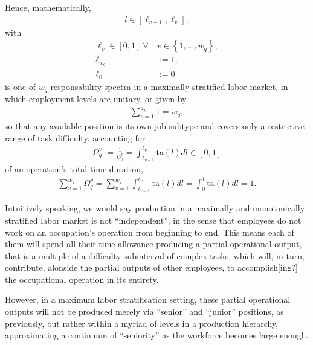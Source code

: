 \documentclass[hidelinks, nonatbib]{elsarticle}
\begin{document}
\begin{enumerate}
Hence, mathematically,
\begin{gather}
    l \in \left[
    \ell_{v-1}
    ,
    \ell_{v}
    \right]
    ,
\end{gather}
with
\begin{align}
    \ell_{v} \in [0,1]
    \
    \forall
    \
    &v \in 
    \left\{
        1, \dots, w_q
    \right\}
    ,
    \\
    \ell_{w_q} &:= 1
    ,
    \\
    \ell_0 &:= 0
\end{align}
is one of $w_q$ responsability spectra in a maximally stratified labor market, in which employment levels are unitary, or given by
\begin{gather}
    \sum_{v=1}^{w_q}
    1
    =
    w_q
    ,
\end{gather}
so that any available position is its own job subtype and covers only a restrictive range of task difficulty, accounting for
\begin{gather}
    \Omega_{q}^{v} := 
    \frac{1}{\mho_{q}^{v}} = 
    \int_{
        \ell_{v-1}
    }^{
        \ell_{v}
    }
    \text{ta}(l)dl
    \in [0,1]
\end{gather}
of an operation's total time duration,
\begin{gather}
    \sum_{v=1}^{w_q}
    \Omega_{q}^{v} 
    = 
    \sum_{v=1}^{w_q}
    \int_{
        \ell_{v-1}
    }^{
        \ell_{v}
    }
    \text{ta}(l)dl
    =
    \int_{0}^{1}
    \text{ta}(l)dl
    =
    1
    .
\end{gather}

Intuitively speaking, we would say production in a maximally and monotonically stratified labor market is not ``independent'', in the sense that employees do not work on an occupation's operation from beginning to end. This means each of them will spend all their time allowance producing a partial operational output, that is a multiple of a difficulty subinterval of complex tasks, which will, in turn, contribute, alonside the partial outputs of other employees, to accomplish[ing?] the occupational operation in its entirety.

However, in a maximum labor stratification setting, these partial operational outputs will not be produced merely via ``senior'' and ``junior'' positions, as previously, but rather within a myriad of levels in a production hierarchy, approximating a continuum of ``seniority'' as the workforce becomes large enough.


\end{enumerate}
\end{document}

